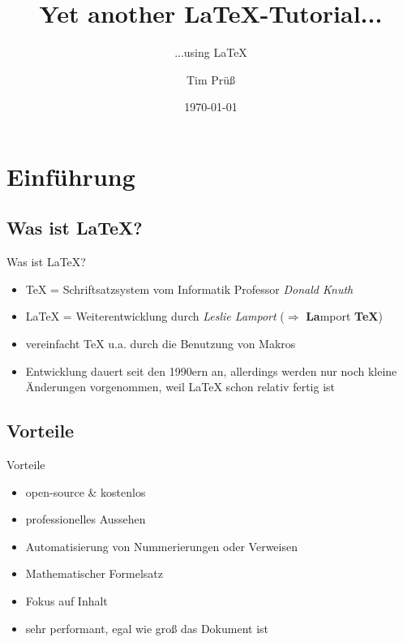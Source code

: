 \documentclass[xcolor=dvipsnames]{beamer}
\title[\LaTeX{}-Tutorium]{Yet another \LaTeX{}-Tutorial...}
\subtitle{...using \LaTeX{}}
\author[Tim P.]{Tim Prüß}
\institute[DHBW]{DHBW Ravensburg Campus Friedrichshafen}
\date{\today}
\begin{document}
\begin{frame}
	\titlepage
\end{frame}

\begin{frame}
	\setcounter{tocdepth}{1}
	\tableofcontents
	\setcounter{tocdepth}{2}
\end{frame}


\section{Einführung}
\subsection{Was ist \LaTeX{}?}
\begin{frame}{Was ist \LaTeX{}?}
\begin{itemize}
	\item \TeX{} = Schriftsatzsystem vom Informatik Professor \textit{Donald Knuth}
	\item \LaTeX{} = Weiterentwicklung durch \textit{Leslie Lamport} ($\Rightarrow$ \textbf{La}mport \textbf{TeX})
	\item vereinfacht TeX u.a. durch die Benutzung von Makros
	\item Entwicklung dauert seit den 1990ern an, allerdings werden nur noch kleine Änderungen vorgenommen, weil \LaTeX{} schon relativ fertig ist
\end{itemize}
\end{frame}


\subsection{Vorteile}
\begin{frame}{Vorteile}
\begin{itemize}
	\item open-source \& kostenlos
	\item professionelles Aussehen
	\item Automatisierung von Nummerierungen oder Verweisen
	\item Mathematischer Formelsatz
	\item Fokus auf Inhalt
	\item sehr performant, egal wie groß das Dokument ist
\end{itemize}
\end{frame}
\end{document}
